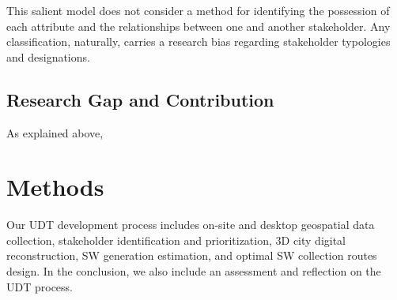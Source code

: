 \documentclass[authoryear,preprint,review,11pt,doubleblind]{elsarticle}
\begin{document}
    
    This  salient model does not consider a method for identifying the possession of each attribute and the relationships between one and another stakeholder. Any classification, naturally, carries a research bias regarding stakeholder typologies and designations.

\subsection{Research Gap and Contribution}

As explained above,
    
    \section{Methods} \label{sec:Methods}
    Our UDT development process includes on-site and desktop geospatial data collection, stakeholder identification and prioritization, 3D city digital reconstruction, SW generation estimation, and optimal SW collection routes design. In the conclusion, we also include an assessment and reflection on the UDT process.
\end{document}
